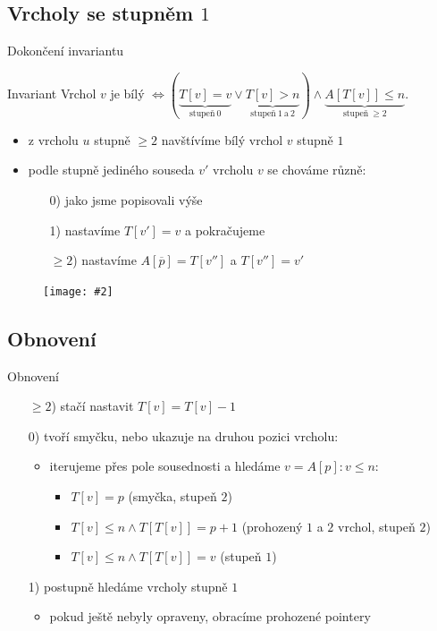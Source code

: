\documentclass[czech]{beamer}
\makeatletter
\newcommand{\fitimage}[2][\@nil]{
	\begin{figure}
		\begin{adjustbox}{width=0.9\textwidth, totalheight=\textheight-2\baselineskip-2\baselineskip,keepaspectratio}
			\texttt{[image: \#2]}
		\end{adjustbox}
		\def\tmp{#1}%
	 \ifx\tmp\@nnil
			\else
			\caption{#1}
		\fi
	\end{figure}
}
\makeatother
\begin{document}
	\subsection{Vrcholy se stupněm $1$}
	\begin{frame}{Dokončení invariantu}
		\begin{block}{Invariant}
			Vrchol $v$ je bílý $\iff (\underbrace{T\left[v\right] = v}_{\text{stupeň}\ 0} \lor \underbrace{T[v] > n}_{\text{stupeň}\ 1\ \text{a}\ 2}) \land \underbrace{A[T[v]] \le n}_{\text{stupeň}\ \ge2}$.
		\end{block}
		\vfill
		\begin{itemize}
			\item z vrcholu $u$ stupně $\ge 2$ navštívíme bílý vrchol $v$ stupně $1$
			\item podle stupně jediného souseda $v'$ vrcholu $v$ se chováme různě:
			\begin{enumerate}
				\item[0)] jako jsme popisovali výše
				\item[1)] nastavíme $T[v'] = v$ a pokračujeme
				\item[$\ge 2$)] nastavíme $A[\overline{p}] = T[v'']$ a $T[v''] = v'$
			\end{enumerate}
		\end{itemize}
		\fitimage{images/deg1.png}
	\end{frame}

	\subsection{Obnovení}
	\begin{frame}{Obnovení}
		\hfill
		\begin{minipage}[t]{0.97\textwidth}
			\begin{enumerate}
				\item[$\ge 2$)] stačí nastavit $T[v] = T[v] - 1$
				\item[0)] tvoří smyčku, nebo ukazuje na druhou pozici vrcholu:
				\begin{itemize}
					\item iterujeme přes pole sousednosti a hledáme $v = A[p]: v \le n$:
					\begin{itemize}
						\item $T[v] = p$ (smyčka, stupeň $2$)
						\item $T[v] \le n \land T[T[v]] = p + 1$ (prohozený $1$ a $2$ vrchol, stupeň $2$)
						\item $T[v] \le n \land T[T[v]] = v$ (stupeň $1$)
					\end{itemize}
				\end{itemize}
				\item[1)] postupně hledáme vrcholy stupně $1$
				\begin{itemize}
					\item pokud ještě nebyly opraveny, obracíme prohozené pointery
				\end{itemize}
			\end{enumerate}
		\end{minipage}
	\end{frame}
\end{document}

